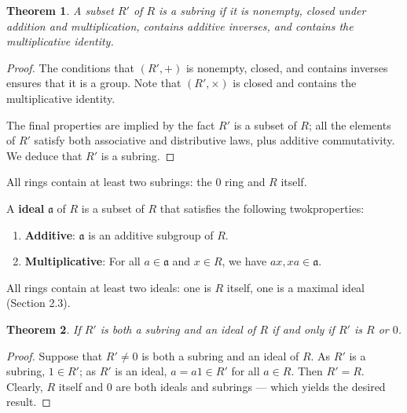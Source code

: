 \documentclass[11pt]{article}
\newtheorem{theorem}{Theorem}
\begin{document}
\begin{adjustwidth}{0.5cm}{}
	\begin{theorem}
		A subset $R'$ of $R$ is a subring if it is nonempty, closed under addition and multiplication, contains additive inverses, and contains the multiplicative identity.
	\end{theorem}
	\begin{proof}
		The conditions that $(R', +)$ is nonempty, closed, and contains inverses ensures that it is a group. Note that $(R', \times)$ is closed and contains the multiplicative identity. 

		The final properties are implied by the fact $R'$ is a subset of $R$; all the elements of $R'$ satisfy both associative and distributive laws, plus additive commutativity. We deduce that $R'$ is a subring.
	\end{proof}
\end{adjustwidth}

All rings contain at least two subrings: the $0$ ring and $R$ itself.

\newpage

A \textbf{ideal} $\mathfrak{a}$ of $R$ is a subset of $R$ that satisfies the following twokproperties:
\begin{enumerate}
	\item \textbf{Additive}: $\mathfrak{a}$ is an additive subgroup of $R$.
	\item \textbf{Multiplicative}: For all $a \in \mathfrak{a}$ and $x \in R$, we have $ax, xa \in \mathfrak{a}$.
\end{enumerate}

All rings contain at least two ideals: one is $R$ itself, one is a maximal ideal (Section 2.3).

\begin{adjustwidth}{0.5cm}{}
	\begin{theorem}
		If $R'$ is both a subring and an ideal of $R$ if and only if $R'$ is $R$ or $0$.
	\end{theorem}
	\begin{proof}
		Suppose that $R' \ne 0$ is both a subring and an ideal of $R$. As $R'$ is a subring, $1 \in R'$; as $R'$ is an ideal, $a = a1 \in R'$ for all $a \in R$. Then $R' = R$. Clearly, $R$ itself and $0$ are both ideals and subrings --- which yields the desired result.
	\end{proof}
\end{adjustwidth}

\end{document}
